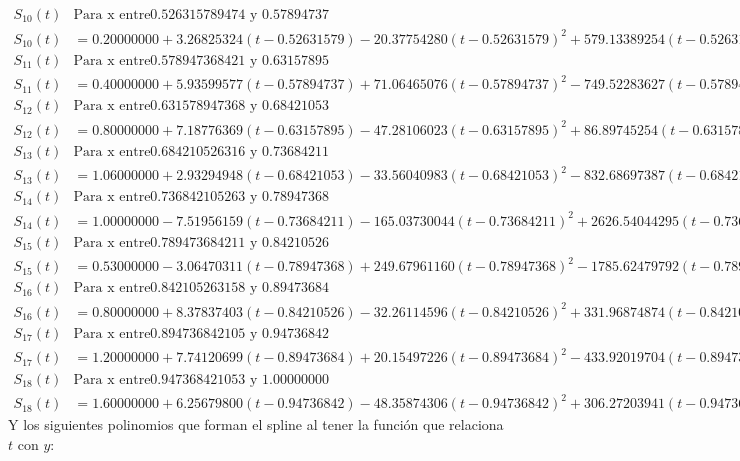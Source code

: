 \begin{align*}
S_10(t) & \text{Para x entre} 0.526315789474 \text{ y } 0.57894737 \\
S_10(t) & = 0.20000000+3.26825324(t-0.52631579)-20.37754280(t-0.52631579)^2+579.13389254(t-0.52631579)^3 \\
S_11(t) & \text{Para x entre} 0.578947368421 \text{ y } 0.63157895 \\
S_11(t) & = 0.40000000+5.93599577(t-0.57894737)+71.06465076(t-0.57894737)^2-749.52283627(t-0.57894737)^3 \\
S_12(t) & \text{Para x entre} 0.631578947368 \text{ y } 0.68421053 \\
S_12(t) & = 0.80000000+7.18776369(t-0.63157895)-47.28106023(t-0.63157895)^2+86.89745254(t-0.63157895)^3 \\
S_13(t) & \text{Para x entre} 0.684210526316 \text{ y } 0.73684211 \\
S_13(t) & = 1.06000000+2.93294948(t-0.68421053)-33.56040983(t-0.68421053)^2-832.68697387(t-0.68421053)^3 \\
S_14(t) & \text{Para x entre} 0.736842105263 \text{ y } 0.78947368 \\
S_14(t) & = 1.00000000-7.51956159(t-0.73684211)-165.03730044(t-0.73684211)^2+2626.54044295(t-0.73684211)^3 \\
S_15(t) & \text{Para x entre} 0.789473684211 \text{ y } 0.84210526 \\
S_15(t) & = 0.53000000-3.06470311(t-0.78947368)+249.67961160(t-0.78947368)^2-1785.62479792(t-0.78947368)^3 \\
S_16(t) & \text{Para x entre} 0.842105263158 \text{ y } 0.89473684 \\
S_16(t) & = 0.80000000+8.37837403(t-0.84210526)-32.26114596(t-0.84210526)^2+331.96874874(t-0.84210526)^3 \\
S_17(t) & \text{Para x entre} 0.894736842105 \text{ y } 0.94736842 \\
S_17(t) & = 1.20000000+7.74120699(t-0.89473684)+20.15497226(t-0.89473684)^2-433.92019704(t-0.89473684)^3 \\
S_18(t) & \text{Para x entre} 0.947368421053 \text{ y } 1.00000000 \\
S_18(t) & = 1.60000000+6.25679800(t-0.94736842)-48.35874306(t-0.94736842)^2+306.27203941(t-0.94736842)^3
\end{align*}
Y los siguientes polinomios que forman el spline al tener la función que relaciona $t$ con $y$:

